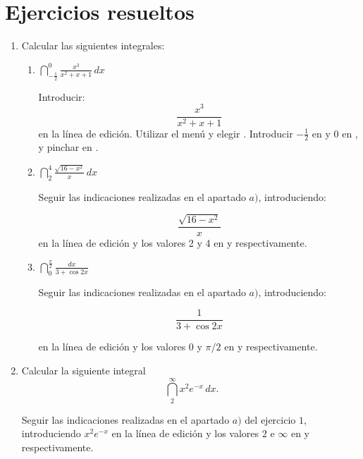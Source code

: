 \section{Ejercicios resueltos}
\begin{enumerate}[leftmargin=*]
\item Calcular las siguientes integrales:
\begin{enumerate}
\item $ \dint^{0}_{-\frac{1}{2}}{\frac{x^{3}}{x^{2}+x+1}}\,dx$
\begin{indicacion}
{Introducir:
\[
\frac{x^{3}}{x^{2}+x+1}
\]
en la línea de edición. Utilizar el menú 
y elegir . Introducir $-\frac{1}{2}$ en
 y 0 en , y pinchar
en . }
\end{indicacion}

\item $ \dint^{4}_{2}{\frac{\sqrt{16-x^{2}}}{x}\,dx}$

\begin{indicacion}
{Seguir las indicaciones realizadas en el apartado $a)$,
introduciendo:

\[
\frac{\sqrt{16-x^{2}}}{x}
\]
en la línea de edición y los valores 2 y 4 en  y  respectivamente.}
\end{indicacion}

\item $ \dint^{\frac{\pi}{2}}_{0}{\frac{dx}{3+\cos{2x}}}$

\begin{indicacion}
{Seguir las indicaciones realizadas en el apartado $a)$,
introduciendo:

\[
\frac{1}{3+\cos{2x}}
\]

en la línea de edición y los valores 0 y $\pi/2$ en  y  respectivamente.}
\end{indicacion}
\end{enumerate}

\item Calcular la siguiente integral
\[
\  \dint_{2}^{\infty}{x^{2}e^{-x}\,dx}.
\]

\begin{indicacion}
{Seguir las indicaciones realizadas en el apartado $a)$ del
ejercicio $1$, introduciendo $x^{2}e^{-x}$ en la línea de edición y
los valores $2$ e ${\infty}$ en 
 y  respectivamente.}
\end{indicacion}


\end{enumerate}
